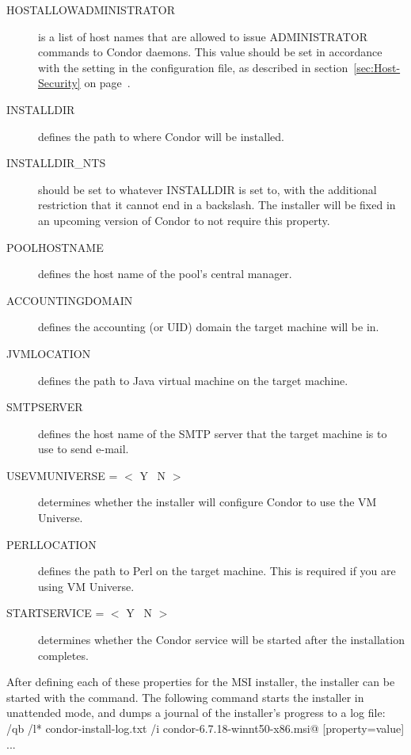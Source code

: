 \begin{description}
\item[HOSTALLOWADMINISTRATOR]
is a list of host names that are allowed to issue ADMINISTRATOR commands to
Condor daemons. This value should be set in accordance with the
 setting in the configuration file, 
as described in
section~\ref{sec:Host-Security} on page~\pageref{sec:Host-Security}.

\item[INSTALLDIR]
defines the path to where Condor will be installed. 

\item[INSTALLDIR\_NTS]
should be set to whatever INSTALLDIR is set to, with the additional
restriction that it cannot end in a backslash. The installer will be fixed
in an upcoming version of Condor to not require this property.

\item[POOLHOSTNAME]
defines the host name of the pool's central manager. 

\item[ACCOUNTINGDOMAIN] 
defines the accounting (or UID) domain the target machine will be in.

\item[JVMLOCATION]
defines the path to Java virtual machine on the target machine.

\item[SMTPSERVER]
defines the host name of the SMTP server that the target machine is to
use to send e-mail.

\item[USEVMUNIVERSE = $<$ Y \Bar\ N $>$]
determines whether the installer will configure Condor to use the VM Universe.

\item[PERLLOCATION]
defines the path to Perl on the target machine. This is required if you
are using VM Universe.

\item [STARTSERVICE = $<$ Y \Bar\ N $>$]
determines whether the Condor service will be started after the installation
completes.
\end {description}

After defining each of these properties for the MSI installer, the
installer can be started with the \verb@msiexec@ command. The following
command starts the installer in unattended mode, and dumps a journal of
the installer's progress to a log file:\\
\verb@msiexec /qb /l* condor-install-log.txt /i condor-6.7.18-winnt50-x86.msi@ [property=value] ... \\

